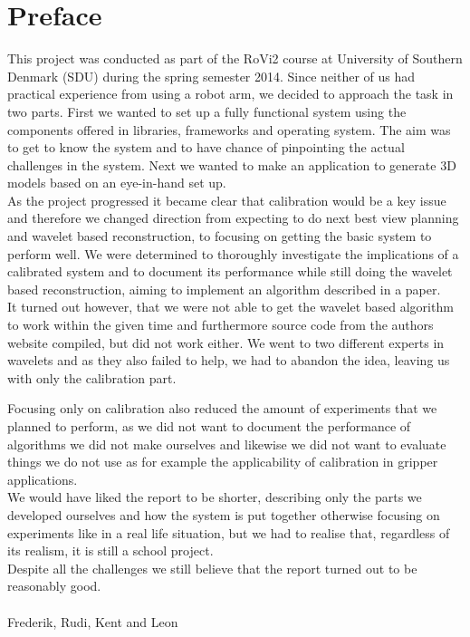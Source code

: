 \chapter*{Preface}
This project was conducted as part of the RoVi2 course at University of Southern Denmark (SDU) during the spring semester 2014. Since neither of us had practical experience from using a robot arm, we decided to approach the task in two parts. First we wanted to set up a fully functional system using the components offered in libraries, frameworks and operating system. The aim was to get to know the system and to have chance of pinpointing the actual challenges in the system. Next we wanted to make an application to generate 3D models based on an eye-in-hand set up.\\

As the project progressed it became clear that calibration would be a key issue and therefore we changed direction from expecting to do next best view planning and wavelet based reconstruction, to focusing on getting the basic system to perform well. We were determined to thoroughly investigate the implications of a calibrated system and to document its performance while still doing the wavelet based reconstruction, aiming to implement an algorithm described in a paper. \\

It turned out however, that we were not able to get the wavelet based algorithm to work within the given time and furthermore source code from the authors website compiled, but did not work either. We went to two different experts in wavelets and as they also failed to help, we had to abandon the idea, leaving us with only the calibration part.

Focusing only on calibration also reduced the amount of experiments that we planned to perform, as we did not want to document the performance of algorithms we did not make ourselves and likewise we did not want to evaluate things we do not use as for example the applicability of calibration in gripper applications. \\

We would have liked the report to be shorter, describing only the parts we developed ourselves and how the system is put together otherwise focusing on experiments like in a real life situation, but we had to realise that, regardless of its realism, it is still a school project.\\

Despite all the challenges we still believe that the report turned out to be reasonably good.\\
 \\
 Frederik, Rudi, Kent and Leon